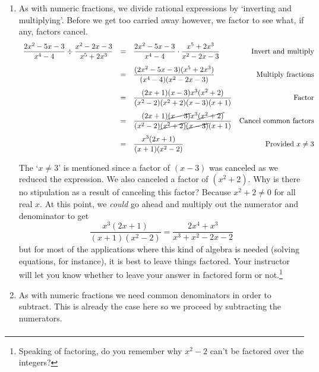 \begin{ex}
\begin{enumerate}

\item As with numeric fractions, we divide rational expressions by `inverting and multiplying'.  Before we get too carried away however, we factor to see what, if any, factors cancel.\[ \begin{array}{rclr}

\dfrac{2x^2-5x-3}{x^4 - 4} \div \dfrac{x^2-2x-3}{x^5 + 2x^3} & = & \dfrac{2x^2-5x-3}{x^4 - 4} \cdot \dfrac{x^5 + 2x^3}{x^2-2x-3} & \text{Invert and multiply} \\ [13pt]

& = & \dfrac{(2x^2-5x-3)(x^5 + 2x^3)}{(x^4 - 4)(x^2-2x-3)} & \text{Multiply fractions}  \\ [13pt]

& = & \dfrac{(2x+1)(x-3)x^3(x^2+2)}{(x^2-2)(x^2+2)(x-3)(x+1)} & \text{Factor} \\ [13pt]

& = & \dfrac{(2x+1)\cancel{(x-3)}x^3\cancel{(x^2+2)}}{(x^2-2)\cancel{(x^2+2)}\cancel{(x-3)}(x+1)} & \text{Cancel common factors} \\ [13pt]

& = & \dfrac{x^3(2x+1)}{(x+1)(x^2-2)} & \text{Provided $x \neq 3$} \\

\end{array}\]

The `$x \neq 3$' is mentioned since a factor of $(x-3)$ was canceled as we reduced the expression.  We also canceled a factor of $(x^2+2)$.  Why is there no stipulation as a result of canceling this factor? Because $x^2 + 2 \neq 0$ for all real $x$.   At this point, we \textit{could} go ahead and multiply out the numerator and denominator to get \[\dfrac{x^3(2x+1)}{(x+1)(x^2-2)}  = \dfrac{2x^4 + x^3}{x^3+x^2-2x-2}\] but for most of the applications where this kind of algebra is needed (solving equations, for instance), it is best to leave things factored.  Your instructor will let you know whether to leave your answer in factored form or not.\footnote{Speaking of factoring, do you remember why $x^2-2$ can't be factored over the integers?}

\item  As with numeric fractions we need common denominators in order to subtract.  This is already the case here so we proceed by subtracting the numerators. \[ \begin{array}{rclr}


\end{array}\]
\end{enumerate}
\end{ex}
